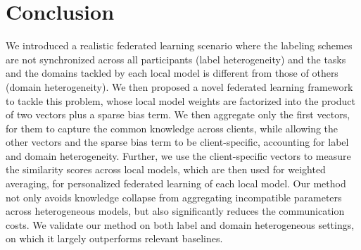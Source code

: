 \section{Conclusion}
We introduced a realistic federated learning scenario where the labeling schemes are not synchronized across all participants (label heterogeneity) and the tasks and the domains tackled by each local model is different from those of others (domain heterogeneity). We then proposed a novel federated learning framework to tackle this problem, whose local model weights are factorized into the product of two vectors plus a sparse bias term. We then aggregate only the first vectors, for them to capture the common knowledge across clients, while allowing the other vectors and the sparse bias term to be client-specific, accounting for label and domain heterogeneity. Further, we use the client-specific vectors to measure the similarity scores across local models, which are then used for weighted averaging, for personalized federated learning of each local model. Our method not only avoids knowledge collapse from aggregating incompatible parameters across heterogeneous models, but also significantly reduces the communication costs. We validate our method on both label and domain heterogeneous settings, on which it largely outperforms relevant baselines.